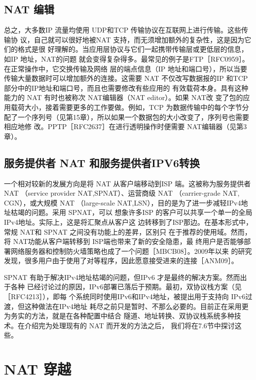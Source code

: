\subsection{NAT 编辑}

总之，大多数IP 流量均使用 UDP和TCP 传输协议在互联网上进行传输。这些传输协
议，自己就可以很好地被NAT 支持，而无须增加额外的复杂性，这是因为它们的格式是很
好理解的。当应用层协议与它们一起携带传输层或更低层的信息，如IP 地址，NAT的问题
就会变得复杂得多。最常见的例子是FTP［RFC0959］。在正常操作中，它交换传输及网络
层的端点信息（IP 地址和端口号），所以当要传输大量数据时可以增加额外的连接。这需要
NAT 不仅改写数据报的IP 和TCP部分中的IP地址和端口号，而且也需要修改有些应用的
有效载荷本身。具有这种能力的 NAT 有时也被称次 NAT编辑器（NAT editor）。如果 NAT改
变了包的应用载荷大小，接着需要更多的工作要做。例如，TCP 为数据传输中的每个字节分
配了一个序列号（见第15章），所以如果一个数据包的大小改变了，序列号也需要相应地修
改。PPTP［RFC2637］在进行透明操作时便需要 NAT编辑器（见第3章）。

\subsection{服务提供者 NAT 和服务提供者IPV6转换}

一个相对较新的发展方向是将 NAT 从客户端移动到ISP 端。这被称为服务提供者 NAT
（service provider NAT,SPNAT）、运营商级 NAT （carrier-grade NAT, CGN），或大规模 NAT
（large-scale NAT,LSN），目的是为了进一步减轻IPv4地址枯竭的问题。采用 SPNAT，可以
想象许多ISP 的客户可以共享一个单一的全局IPv4地址。实际上，这是将汇聚点从客户这
边转移到了ISP那边。在基本形式中，常规 NAT和 SPNAT 之间没有功能上的差昇，区别只
在于推荐的使用域。然而，将 NAT功能从客户端转移到 ISP端也带来了新的安全隐患，最
终用户是否能够部署网络服务器和控制防火墙策略也成了一个问题［MBCB08］。2009年以来
的研究发现，很多用户由于使用了对等程序，因此愿意接受进来的连接［ANM09］。

SPNAT 有助于解决IPv4地址枯竭的问题，但IPv6 才是最终的解决方案。然而出于各种
已经讨论过的原因，IPv6部署已落后于预期。最初，双协议栈方案（见［RFC4213］），即每
个系统同时使用IPv6和IPv4地址，被提出用于支持向 IPv6过渡，但这种做法在IPv4地址
耗尽之前只是暂时、不那么必要的。目前正在采用更为务实的方法，就是在各种配置中结合
隧道、地址转换、双协议栈系统多种技术。在介绍完为处理现有的 NAT 而开发的方法之后，
我们将在7.6节中探讨这些。

\section{NAT 穿越}


